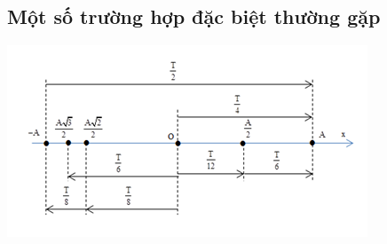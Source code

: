 \subsection{Một số trường hợp đặc biệt thường gặp}
\begin{center}
	\includegraphics[scale=1]{../figs/VN12-PH-02-A-001-4-V2-2.jpg}
\end{center}
